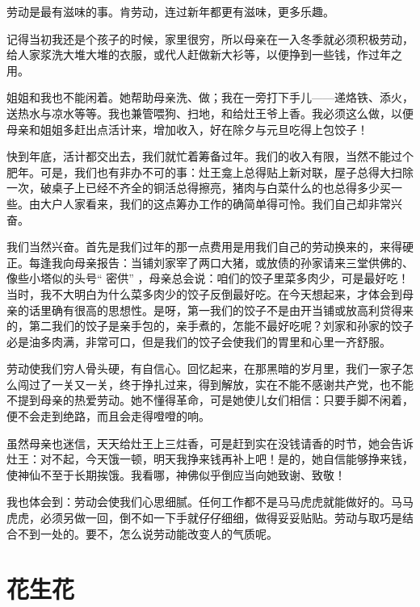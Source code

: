 \documentclass[12pt,UTF-8,openany]{ctexbook}
\begin{document}
\begin{large}
    
    劳动是最有滋味的事。肯劳动，连过新年都更有滋味，更多乐趣。
    
    记得当初我还是个孩子的时候，家里很穷，所以母亲在一入冬季就必须积极劳动，给人家浆洗大堆大堆的衣服，或代人赶做新大衫等，以便挣到一些钱，作过年之用。
    
    姐姐和我也不能闲着。她帮助母亲洗、做；我在一旁打下手儿——递烙铁、添火，送热水与凉水等等。我也兼管喂狗、扫地，和给灶王爷上香。我必须这么做，以便母亲和姐姐多赶出点活计来，增加收入，好在除夕与元旦吃得上包饺子！
    
    快到年底，活计都交出去，我们就忙着筹备过年。我们的收入有限，当然不能过个肥年。可是，我们也有非办不可的事：灶王龛上总得贴上新对联，屋子总得大扫除一次，破桌子上已经不齐全的铜活总得擦亮，猪肉与白菜什么的也总得多少买一些。由大户人家看来，我们的这点筹办工作的确简单得可怜。我们自己却非常兴奋。
    
    我们当然兴奋。首先是我们过年的那一点费用是用我们自己的劳动换来的，来得硬正。每逢我向母亲报告：当铺刘家宰了两口大猪，或放债的孙家请来三堂供佛的、像些小塔似的头号“ 密供” ，母亲总会说：咱们的饺子里菜多肉少，可是最好吃！当时，我不大明白为什么菜多肉少的饺子反倒最好吃。在今天想起来，才体会到母亲的话里确有很高的思想性。是呀，第一我们的饺子不是由开当铺或放高利贷得来的，第二我们的饺子是亲手包的，亲手煮的，怎能不最好吃呢？刘家和孙家的饺子必是油多肉满，非常可口，但是我们的饺子会使我们的胃里和心里一齐舒服。
    
    劳动使我们穷人骨头硬，有自信心。回忆起来，在那黑暗的岁月里，我们一家子怎么闯过了一关又一关，终于挣扎过来，得到解放，实在不能不感谢共产党，也不能不提到母亲的热爱劳动。她不懂得革命，可是她使儿女们相信：只要手脚不闲着，便不会走到绝路，而且会走得噔噔的响。
    
    虽然母亲也迷信，天天给灶王上三炷香，可是赶到实在没钱请香的时节，她会告诉灶王：对不起，今天饿一顿，明天我挣来钱再补上吧！是的，她自信能够挣来钱，使神仙不至于长期挨饿。我看哪，神佛似乎倒应当向她致谢、致敬！
    
    我也体会到：劳动会使我们心思细腻。任何工作都不是马马虎虎就能做好的。马马虎虎，必须另做一回，倒不如一下手就仔仔细细，做得妥妥贴贴。劳动与取巧是结合不到一处的。要不，怎么说劳动能改变人的气质呢。
    
\end{large}



\chapter{花生花}
\end{document}

